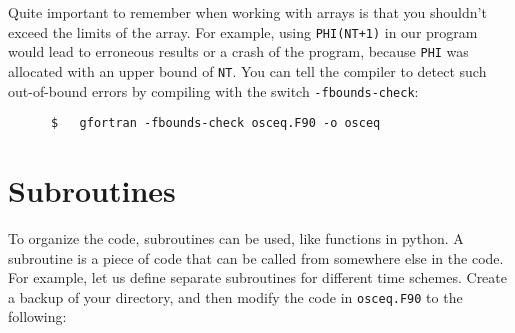 \documentclass[a4paper]{article}
\begin{document}
%
\par
Quite important to remember when working with arrays is that you shouldn't exceed the limits of the array. For example, using \verb|PHI(NT+1)| in our program would lead to erroneous results or a crash of the program, because \verb+PHI+ was allocated with an upper bound of \verb+NT+. You can tell the compiler to detect such out-of-bound errors by compiling with the switch \verb+-fbounds-check+:
%
\begin{verbatim}
	  $   gfortran -fbounds-check osceq.F90 -o osceq
\end{verbatim}
%
\section{Subroutines}
%
\par
To organize the code, subroutines can be used, like functions in python. A subroutine is a piece of code that can be called from somewhere else in the code. For example, let us define separate subroutines for different time schemes. Create a backup of your directory, and then modify the code in \texttt{osceq.F90} to the following:
%
\end{document}
